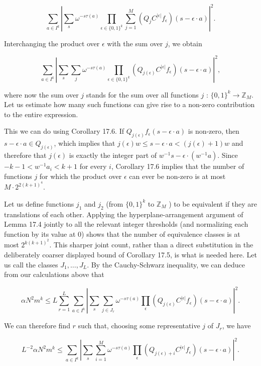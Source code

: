 \documentclass[10pt]{article}
\begin{document}
$$
\sum_{a \in I^{k}}\left|\sum_{s} \omega^{-s \tau(a)} \prod_{\epsilon \in\{0,1\}^{k}} \sum_{j=1}^{M}\left(Q_{j} C^{|\epsilon|} f_{\epsilon}\right)(s-\epsilon \cdot a)\right|^{2} .
$$

Interchanging the product over $\epsilon$ with the sum over $j$, we obtain

$$
\sum_{a \in I^{k}}\left|\sum_{s} \sum_{j} \omega^{-s \tau(a)} \prod_{\epsilon \in\{0,1\}^{k}}\left(Q_{j(\epsilon)} C^{|\epsilon|} f_{\epsilon}\right)(s-\epsilon \cdot a)\right|^{2},
$$

where now the sum over $j$ stands for the sum over all functions $j$ : $\{0,1\}^{k} \rightarrow \mathbb{Z}_{M}$. Let us estimate how many such functions can give rise to a non-zero contribution to the entire expression.

This we can do using Corollary 17.6. If $Q_{j(\epsilon)} f_{\epsilon}(s-\epsilon \cdot a)$ is non-zero, then $s-\epsilon \cdot a \in Q_{j(\epsilon)}$, which implies that $j(\epsilon) w \leqslant s-\epsilon \cdot a<(j(\epsilon)+1)w$ and therefore that $j(\epsilon)$ is exactly the integer part of $w^{-1} s-\epsilon \cdot\left(w^{-1} a\right)$. Since $-k-1<w^{-1} a_{i}<k+1$ for every $i$, Corollary 17.6 implies that the number of functions $j$ for which the product over $\epsilon$ can ever be non-zero is at most $M \cdot 2^{2(k+1)^{4}}$.

Let us define functions $j_{1}$ and $j_{2}$ (from $\{0,1\}^{k}$ to $\mathbb{Z}_{M}$ ) to be equivalent if they are translations of each other.  Applying the hyperplane-arrangement argument of Lemma 17.4 jointly to all the relevant integer thresholds (and normalizing each function by its value at $0$) shows that the number of equivalence classes is at most $2^{k(k+1)^{2}}$.  This sharper joint count, rather than a direct substitution in the deliberately coarser displayed bound of Corollary 17.5, is what is needed here. Let us call the classes $J_{1}, \ldots, J_{L}$. By the Cauchy-Schwarz inequality, we can deduce from our calculations above that

$$
\alpha N^{2} m^{k} \leqslant L \sum_{r=1}^{L} \sum_{a \in I^{k}}\left|\sum_{s} \sum_{j \in J_{r}} \omega^{-s \tau(a)} \prod_{\epsilon}\left(Q_{j(\epsilon)} C^{|\epsilon|} f_{\epsilon}\right)(s-\epsilon \cdot a)\right|^{2} .
$$

We can therefore find $r$ such that, choosing some representative $j$ of $J_{r}$, we have

$$
L^{-2} \alpha N^{2} m^{k} \leqslant \sum_{a \in I^{k}}\left|\sum_{s} \sum_{i=1}^{M} \omega^{-s \tau(a)} \prod_{\epsilon}\left(Q_{j(\epsilon)+i} C^{|\epsilon|} f_{\epsilon}\right)(s-\epsilon \cdot a)\right|^{2} .
$$
\end{document}
